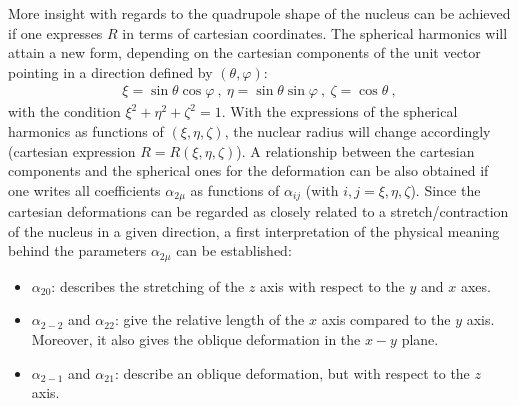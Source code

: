 More insight with regards to the quadrupole shape of the nucleus can be achieved if one expresses $R$ in terms of cartesian coordinates. The spherical harmonics will attain a new form, depending on the cartesian components of the unit vector pointing in a direction defined by $(\theta,\varphi)$:
\begin{align}
    \xi=\sin\theta\cos\varphi\ ,\ \eta=\sin\theta\sin\varphi\ ,\ \zeta=\cos\theta\ ,
\end{align}
with the condition $\xi^2+\eta^2+\zeta^2=1$. With the expressions of the spherical harmonics as functions of $(\xi,\eta,\zeta)$, the nuclear radius will change accordingly (cartesian expression $R=R(\xi,\eta,\zeta)$). A relationship between the cartesian components and the spherical ones for the deformation can be also obtained if one writes all coefficients $\alpha_{2\mu}$ as functions of $\alpha_{ij}$ (with $i,j=\xi,\eta,\zeta$). Since the cartesian deformations can be regarded as closely related to a stretch/contraction of the nucleus in a given direction, a first interpretation of the physical meaning behind the parameters $\alpha_{2\mu}$ can be established:
\begin{itemize}
    \item $\alpha_{20}$: describes the stretching of the $z$ axis with respect to the $y$ and $x$ axes.
    \item $\alpha_{2-2}$ and $\alpha_{22}$: give the relative length of the $x$ axis compared to the $y$ axis. Moreover, it also gives the oblique deformation in the $x-y$ plane.
    \item $\alpha_{2-1}$ and $\alpha_{21}$: describe an oblique deformation, but with respect to the $z$ axis.
\end{itemize}

